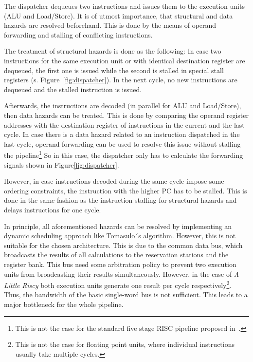 \documentclass[conference]{IEEEtran}
\begin{document}
The dispatcher dequeues two instructions and issues them to the execution units (ALU and Load/Store). It is of utmost importance, that structural and data hazards are resolved beforehand. This is done by the means of operand forwarding and stalling of conflicting instructions.

The treatment of structural hazards is done as the following: In case two instructions for the same execution unit or with identical destination register are dequeued, the first one is issued while the second is stalled in special stall registers (s. Figure~\ref{fig:dispatcher}). In the next cycle, no new instructions are dequeued and the stalled instruction is issued.

Afterwards, the instructions are decoded (in parallel for ALU and Load/Store), then data hazards can be treated. This is done by comparing the operand register addresses with the destination register of instructions in the current and the last cycle. In case there is a data hazard related to an instruction dispatched in the last cycle, operand forwarding can be used to resolve this issue without stalling the pipeline\footnote{This is not the case for the standard five stage RISC pipeline proposed in~\cite{HP}.} So in this case, the dispatcher only has to calculate the forwarding signals shown in Figure\ref{fig:dispatcher}.

However, in case instructions decoded during the same cycle impose some ordering constraints, the instruction with the higher PC has to be stalled. This is done in the same fashion as the instruction stalling for structural hazards and delays instructions for one cycle.

In principle, all aforementioned hazards can be resolved by implementing an dynamic scheduling approach like Tomasulo´s algorithm. However, this is not suitable for the chosen architecture. This is due to the common data bus, which broadcasts the results of all calculations to the reservation stations and the register bank. This bus need some arbitration policy to prevent two execution units from broadcasting their results simultaneously. However, in the case of \emph{A Little Riscy} both execution units generate one result per cycle respectively\footnote{This is not the case for floating point units, where individual instructions usually take multiple cycles.}. Thus, the bandwidth of the basic single-word bus is not sufficient. This leads to a major bottleneck for the whole pipeline.

\end{document}
